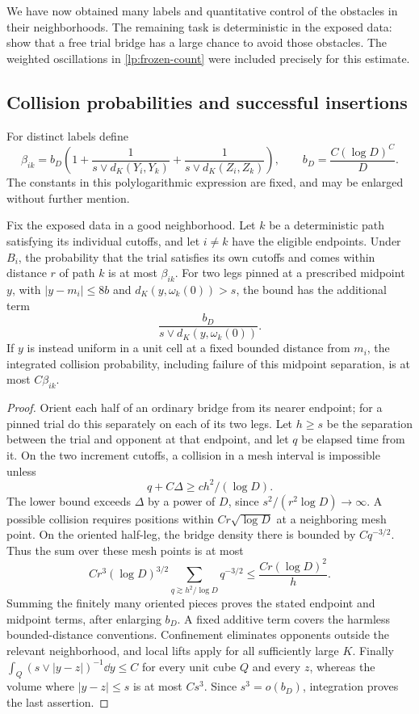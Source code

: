 We have now obtained many labels and quantitative control of the
obstacles in their neighborhoods.  The remaining task is deterministic
in the exposed data: show that a free trial bridge has a large chance
to avoid those obstacles.  The weighted oscillations in
\eqref{lp:frozen-count} were included precisely for this estimate.

\subsection{Collision probabilities and successful insertions}

For distinct labels define
\begin{equation}\label{lp:beta}
 \beta_{ik}=b_D\left(1+
       \frac1{s\vee d_K(Y_i,Y_k)}+
       \frac1{s\vee d_K(Z_i,Z_k)}\right),
 \qquad b_D=\frac{C(\log D)^C}{D}.
\end{equation}
The constants in this polylogarithmic expression are fixed, and may
be enlarged without further mention.

\begin{lemma}\label{lp:collision}
Fix the exposed data in a good neighborhood.  Let $k$ be a deterministic
path satisfying its individual cutoffs, and let $i\ne k$ have the
eligible endpoints.  Under $B_i$, the probability that the trial
satisfies its own cutoffs and comes within distance $r$ of path $k$
is at most $\beta_{ik}$.  For two legs pinned at a prescribed midpoint
$y$, with $|y-m_i|\leq8b$ and
$d_K(y,\omega_k(0))>s$, the bound has the additional term
\[
 \frac{b_D}{s\vee d_K(y,\omega_k(0))}.
\]
If $y$ is instead uniform in a unit cell at a fixed bounded distance
from $m_i$, the integrated collision probability, including failure
of this midpoint separation, is at most $C\beta_{ik}$.
\end{lemma}

\begin{proof}
Orient each half of an ordinary bridge from its nearer endpoint;
for a pinned trial do this separately on each of its two legs.  Let
$h\geq s$ be the separation between the trial and opponent at that
endpoint, and let $q$ be elapsed time from it.  On the two increment
cutoffs, a collision in a mesh interval is impossible unless
\[
 q+C\Delta\geq c h^2/(\log D).
\]
The lower bound exceeds $\Delta$ by a power of $D$, since
$s^2/(r^2\log D)\to\infty$.  A possible collision requires positions
within $Cr\sqrt{\log D}$ at a neighboring mesh point.  On the
oriented half-leg, the bridge density there is bounded by $Cq^{-3/2}$.
Thus the sum over these mesh points is at most
\[
 C r^3(\log D)^{3/2}
   \sum_{q\gtrsim h^2/\log D}q^{-3/2}
 \leq \frac{Cr(\log D)^2}{h}.
\]
Summing the finitely many oriented pieces proves the stated endpoint
and midpoint terms, after enlarging $b_D$.  A fixed additive term
covers the harmless bounded-distance conventions.  Confinement
eliminates opponents outside the relevant neighborhood, and local
lifts apply for all sufficiently large $K$.  Finally
$\int_Q(s\vee|y-z|)^{-1}\dd y\leq C$ for every unit cube $Q$ and
every $z$, whereas the volume where $|y-z|\leq s$ is at most $Cs^3$.
Since $s^3=o(b_D)$, integration proves the last assertion.
\end{proof}

